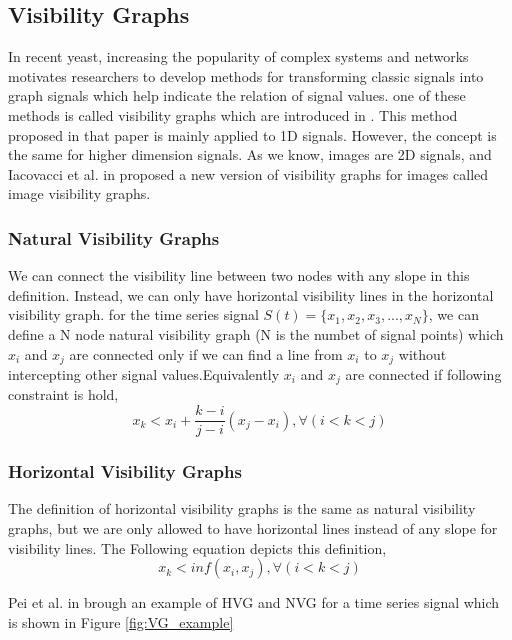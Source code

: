 \documentclass[conference]{IEEEtran}
\begin{document}
\subsection{\textbf{Visibility Graphs}}
In recent yeast, increasing the popularity of complex systems and networks motivates researchers to develop methods for transforming classic signals into graph signals which help indicate the relation of signal values. one of these methods is called visibility graphs which are introduced in \cite{VG}. This method proposed in that paper is mainly applied to 1D signals. However, the concept is the same for higher dimension signals. As we know, images are 2D signals, and Iacovacci et al. in \cite{IVG} proposed a new version of visibility graphs for images called image visibility graphs.



\subsubsection{Natural Visibility Graphs}
We can connect the visibility line between two nodes with any slope in this definition. Instead, we can only have horizontal visibility lines in the horizontal visibility graph.
for the time series signal $S(t)=\{x_1,x_2,x_3,...,x_N\}$, we can define a N node natural visibility graph (N is the numbet of signal points) which $x_i$ and $x_j$ are connected only if we can find a line from $x_i$ to $x_j$ without intercepting other signal values.Equivalently $x_i$ and $x_j$ are connected if following constraint is hold,
\begin{equation}
x_k < x_i +\frac{k-i}{j-i}(x_j-x_i), \forall(i<k<j)
\end{equation}



\subsubsection{Horizontal Visibility Graphs}

The definition of horizontal visibility graphs is the same as natural visibility graphs, but we are only allowed to have horizontal lines instead of any slope for visibility lines. The  Following equation depicts this definition,
\begin{equation}
x_k < inf(x_i, x_j), \forall(i<k<j)
\end{equation}

Pei et al. in \cite{china_HVG} brough an example of HVG and NVG for a time series signal which is shown in Figure \ref{fig:VG_example}
\end{document}
